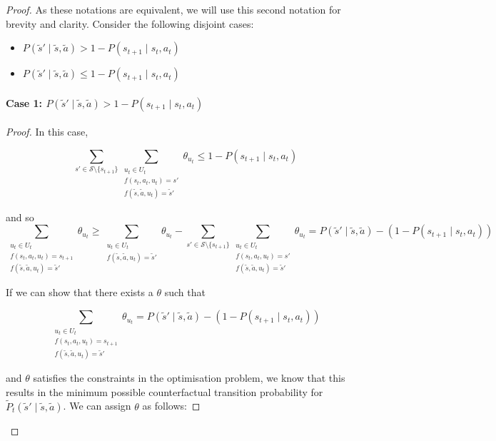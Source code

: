 \begin{proof}
As these notations are equivalent, we will use this second notation for brevity and clarity. Consider the following disjoint cases:

\begin{itemize}
    \item $P(\tilde{s}' \mid \tilde{s}, \tilde{a}) > 1 - P(s_{t+1} \mid s_t, a_t)$
    \item $P(\tilde{s}' \mid \tilde{s}, \tilde{a}) \leq 1 - P(s_{t+1} \mid s_t, a_t)$
\end{itemize}

\paragraph{Case 1: $P(\tilde{s}' \mid \tilde{s}, \tilde{a}) > 1 - P(s_{t+1} \mid s_t, a_t)$}
\noindent
\begin{proof}
In this case,

\[
    \sum_{s' \in \mathcal{S}\setminus{\{s_{t+1}\}}}\sum_{\substack{u_t \in U_t \\f(s_t, a_t, u_t) = s' \\ f(\tilde{s}, \tilde{a}, u_t) = \tilde{s}'}} \theta_{u_t} \leq 1 - P(s_{t+1} \mid s_t, a_t)
\]

and so
\[
\sum_{\substack{u_t \in U_t \\f(s_t, a_t, u_t) = s_{t+1} \\ f(\tilde{s}, \tilde{a}, u_t) = \tilde{s}'}} \theta_{u_t} \geq \sum_{\substack{u_t \in U_t \\ f(\tilde{s}, \tilde{a}, u_t) = \tilde{s}'}} \theta_{u_t} - \sum_{s' \in \mathcal{S}\setminus{\{s_{t+1}\}}}\sum_{\substack{u_t \in U_t \\f(s_t, a_t, u_t) = s' \\ f(\tilde{s}, \tilde{a}, u_t) = \tilde{s}'}} \theta_{u_t}= P(\tilde{s}' \mid \tilde{s}, \tilde{a}) - (1 - P(s_{t+1} \mid s_t, a_t))
\]

If we can show that there exists a $\theta$ such that

\[
\sum_{\substack{u_t \in U_t \\f(s_t, a_t, u_t) = s_{t+1} \\ f(\tilde{s}, \tilde{a}, u_t) = \tilde{s}'}} \theta_{u_t} = P(\tilde{s}' \mid \tilde{s}, \tilde{a}) - (1 - P(s_{t+1} \mid s_t, a_t))
\]

and $\theta$ satisfies the constraints in the optimisation problem, we know that this results in the minimum possible counterfactual transition probability for $\tilde{P}_t(\tilde{s}' \mid \tilde{s}, \tilde{a})$. We can assign $\theta$ as follows:


\end{proof}
\end{proof}
